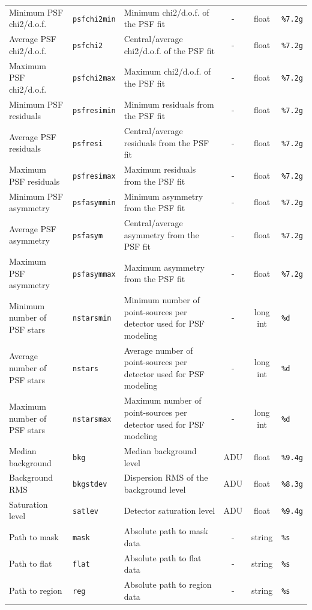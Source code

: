 \documentclass[twoside,a4paper]{article}
\begin{document}
\begin{table}
{\begin{tabular}{|l|l|l|c|c|l|}
Minimum PSF chi2/d.o.f. & {\tt psfchi2min} & Minimum chi2/d.o.f. of the PSF fit & - & float & {\tt \%7.2g}\\
Average PSF chi2/d.o.f. & {\tt psfchi2} & Central/average chi2/d.o.f. of the PSF fit & - & float & {\tt \%7.2g}\\
Maximum PSF chi2/d.o.f. & {\tt psfchi2max} & Maximum chi2/d.o.f. of the PSF fit & - & float & {\tt \%7.2g}\\
Minimum PSF residuals & {\tt psfresimin} & Minimum residuals from the PSF fit & - & float & {\tt \%7.2g}\\
Average PSF residuals & {\tt psfresi} & Central/average residuals from the PSF fit & - & float & {\tt \%7.2g}\\
Maximum PSF residuals & {\tt psfresimax} & Maximum residuals from the PSF fit & - & float & {\tt \%7.2g}\\
Minimum PSF asymmetry & {\tt psfasymmin} & Minimum asymmetry from the PSF fit & - & float & {\tt \%7.2g}\\
Average PSF asymmetry & {\tt psfasym} & Central/average asymmetry from the PSF fit & - & float & {\tt \%7.2g}\\
Maximum PSF asymmetry & {\tt psfasymmax} & Maximum asymmetry from the PSF fit & - & float & {\tt \%7.2g}\\
Minimum number of PSF stars & {\tt nstarsmin} & Minimum number of point-sources per detector used for PSF modeling & - & long int & {\tt \%d}\\
Average number of PSF stars & {\tt nstars} & Average number of point-sources per detector used for PSF modeling & - & long int & {\tt \%d}\\
Maximum number of PSF stars & {\tt nstarsmax} & Maximum number of point-sources per detector used for PSF modeling & - & long int & {\tt \%d}\\
Median background & {\tt bkg} & Median background level & ADU & float & {\tt \%9.4g}\\
Background RMS & {\tt bkgstdev} & Dispersion RMS of the background level & ADU & float & {\tt \%8.3g}\\
Saturation level & {\tt satlev} & Detector saturation level & ADU & float & {\tt \%9.4g}\\
Path to mask & {\tt mask} & Absolute path to mask data & - & string & {\tt \%s}\\
Path to flat & {\tt flat} & Absolute path to flat data & - & string & {\tt \%s}\\
Path to region & {\tt reg} & Absolute path to region data & - & string & {\tt \%s}\\

\end{tabular}}
\end{table}
\end{document}
